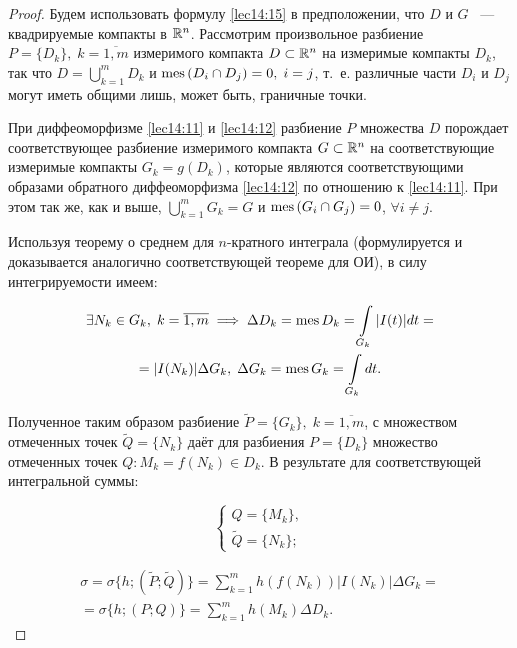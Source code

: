 \documentclass[../../main.tex]{subfiles}
\begin{document}
	
	\begin{proof}
		
	Будем использовать формулу \eqref{lec14:15} в предположении, что
	$D$ и $G$ ~--- квадрируемые компакты в $\mathbb{R}^n$. Рассмотрим произвольное 
	разбиение $P =
	\{ D_k \},\; k = \overline{1, m}$ измеримого компакта $D \subset 
	\mathbb{R}^n$ на измеримые компакты $D_k$, так что $D = \bigcup\limits_{k = 1}^{m} 
	D_k$ 
	и $\operatorname{mes}\left(D_i \cap D_j\right) = 0,\; i = j$, т.~е. различные части $D_i$ и 
	$D_j$ могут иметь общими лишь, может быть, граничные точки.
		   
	При диффеоморфизме \eqref{lec14:11} и \eqref{lec14:12} разбиение $P$ 
	множества $D$ порождает соответствующее разбиение измеримого компакта 
	$G \subset \mathbb{R}^n$ на соответствующие измеримые компакты
	$G_k = g(D_k)$, которые являются соответствующими образами обратного 
	диффеоморфизма 
	\eqref{lec14:12} по отношению к \eqref{lec14:11}. При этом так же, как и выше,
	$
	\bigcup\limits_{k = 1}^{m} G_k = G$ и $\operatorname{mes}\left(G_i \cap G_j\right) = 0$, 
	$\forall i \neq j$.
	
	Используя теорему о среднем для $n$-кратного интеграла (формулируется и 
	доказывается аналогично соответствующей теореме для ОИ), 
	в силу интегрируемости имеем:
	
	\[
	\begin{gathered}
	\exists N_k \in G_k,\; k = \overline{1, m} \implies \Delta D_k = \operatorname{mes} D_k 
	= \int\limits_{G_k} |I(t)| dt = \\ = |I(N_k)|
	 \Delta G_k,\; \Delta G_k = \operatorname{mes} G_k = \int\limits_{G_k} dt.
	\end{gathered}
	\]
	
	Полученное таким образом разбиение $\widetilde{P} = \{ G_k  \},\; 
	k = \overline{1, m}$, с множеством отмеченных точек $\widetilde{Q} = \{ N_k \}$
	даёт для разбиения $P = \{D_k\}$ множество отмеченных точек $Q : M_k = 
	f(N_k) 
	\in D_k$. В результате для соответствующей интегральной суммы:
	
	\[
	\begin{cases}
	Q = \{ M_k \},\\
	\widetilde{Q} = \{ N_k \};
	\end{cases}
	\]
	
	\begin{equation}
	\label{lec15:40}
	\begin{gathered}
	\sigma = \sigma \{ h; (\widetilde{P}; \widetilde{Q}) \} = \sum_{k = 1}^{m} h 
	\left( f \left( N_k \right) \right)|I(N_k)| \Delta G_k = \\ = 
	\sigma \{ h; \left( P; Q \right) \} = \sum_{k = 1}^{m} h 
	\left( M_k \right) \Delta D_k.
	\end{gathered}
	\end{equation}
	

\end{proof}
\end{document}
